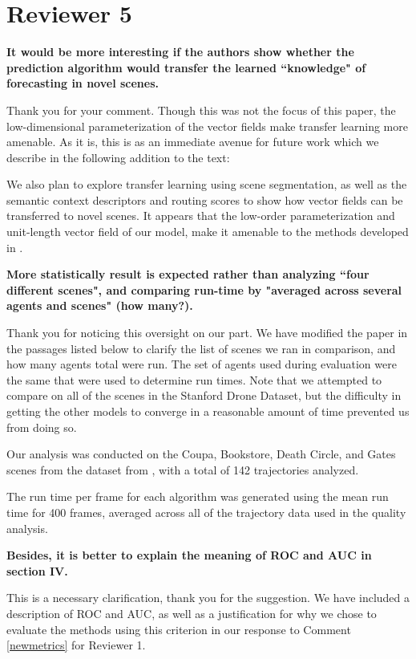 \documentclass[usenames,dvipsnames]{article}
\providecommand{\response}[1]{
\noindent
\noindent\colorbox{gray!20}{
\parbox{\textwidth}{
\setlength{\parskip}{.1in}
\setlength{\parindent}{.1in}
#1}
}
}
\begin{document}
\section*{Reviewer 5}
\begin{enumerate}
\begin{item}
\textbf{
It would be more interesting if the authors show whether
the prediction algorithm would transfer the learned ``knowledge" of
forecasting in novel scenes.}

Thank you for your comment. 
Though this was not the focus of this paper, the low-dimensional parameterization of the vector fields make transfer learning more amenable. 
As it is, this is as an immediate avenue for future work which we describe in the following addition to the text: 
\reversemarginpar{}
\response{We also plan to explore transfer learning using scene segmentation, as well as the semantic context descriptors and routing scores to show how vector fields can be transferred to novel scenes. It appears that the low-order parameterization and unit-length vector field of our model, make it amenable to the methods developed in \cite{Ballan2016}.}


\end{item}
\begin{item}
\textbf{
More statistically result is expected
rather than analyzing ``four different scenes", and comparing run-time
by "averaged across several agents and scenes" (how many?).}

Thank you for noticing this oversight on our part. 
We have modified the paper in the passages listed below to clarify the list of scenes we ran in comparison, and how many agents total were run. 
The set of agents used during evaluation were the same that were used to determine run times. 
Note that we attempted to compare on all of the scenes in the Stanford Drone Dataset, but the difficulty in getting the other models to converge in a reasonable amount of time prevented us from doing so.

\reversemarginpar{}
\response{ Our analysis was conducted on the Coupa, Bookstore, Death Circle, and Gates scenes from the dataset from \cite{Robicquet2016}, with a total of 142 trajectories analyzed.}

\reversemarginpar{}
\response{The run time per frame for each algorithm was generated using the mean run time for 400 frames, averaged across all of the trajectory data used in the quality analysis.}
\end{item}

\begin{item}
\textbf{
Besides, it is better to explain the meaning of ROC and AUC in section IV.}

This is a necessary clarification, thank you for the suggestion. 
We have included a description of ROC and AUC, as well as a justification for why we chose to evaluate the methods using this criterion in our response to Comment \ref{newmetrics} for Reviewer 1.

\end{item}
\end{enumerate}
\end{document}
